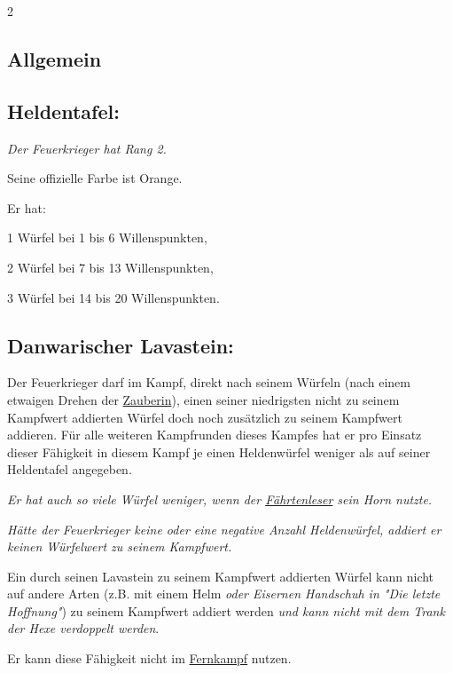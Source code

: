\documentclass[10pt, a4paper, oneside]{book}
\newcommand{\fan}[1]{\textit{#1}}
\begin{document}
\begin{multicols*}{2}\raggedcolumns

\begin{nobgcolor}

\section{Allgemein}


\subsection{Heldentafel:}

\fan{Der Feuerkrieger hat Rang 2.}

Seine offizielle Farbe ist Orange.

Er hat:

\bullet{} 1 Würfel bei 1 bis 6 Willenspunkten,

\bullet{} 2 Würfel bei 7 bis 13 Willenspunkten,

\bullet{} 3 Würfel bei 14 bis 20 Willenspunkten.





\subsection{Danwarischer Lavastein:}

Der Feuerkrieger darf im Kampf, direkt nach seinem Würfeln (nach einem etwaigen Drehen der \hyperref[zauberin]{Zauberin}), einen seiner niedrigsten nicht zu seinem Kampfwert addierten Würfel doch noch zusätzlich zu seinem Kampfwert addieren. Für alle weiteren Kampfrunden dieses Kampfes hat er pro Einsatz dieser Fähigkeit in diesem Kampf je einen Heldenwürfel weniger als auf seiner Heldentafel angegeben.

\fan{Er hat auch so viele Würfel weniger, wenn der \hyperref[faehrtenleser]{Fährtenleser} sein Horn nutzte.}

\fan{Hätte der Feuerkrieger keine oder eine negative Anzahl Heldenwürfel, addiert er keinen Würfelwert zu seinem Kampfwert.}

Ein durch seinen Lavastein zu seinem Kampfwert addierten Würfel kann nicht auf andere Arten (z.B. mit einem Helm \fan{oder Eisernen Handschuh in "Die letzte Hoffnung"}) zu seinem Kampfwert addiert werden \fan{und kann nicht mit dem Trank der Hexe verdoppelt werden}.

Er kann diese Fähigkeit nicht im \hyperref[fernkaempfer]{Fernkampf} nutzen.
\supercite{112103}






\end{nobgcolor}
\end{multicols*}
\end{document}
